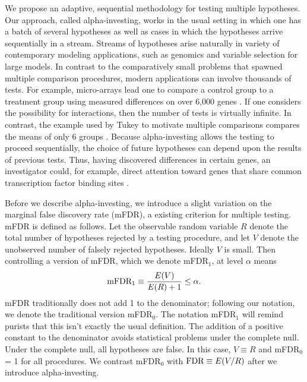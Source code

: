 \documentclass[12pt]{article}
\begin{document}
We propose an adaptive, sequential methodology for testing multiple
hypotheses. Our approach, called alpha-investing, works in the usual
setting in which one has a batch of several hypotheses as well as
cases in which the hypotheses arrive sequentially in a stream.
Streams of hypotheses arise naturally in variety of contemporary
modeling applications, such as genomics and variable selection for
large models.  In contrast to the comparatively small problems that
spawned multiple comparison procedures, modern applications can
involve thousands of tests.  For example, micro-arrays lead one to
compare a control group to a treatment group using measured
differences on over 6,000 genes \citep{shaffer03}.  If one considers
the possibility for interactions, then the number of tests is
virtually infinite. In contrast, the example used by Tukey to motivate
multiple comparisons compares the means of only 6 groups
\citep[][available in \citet{braun94}] {tukey53}.  Because
alpha-investing allows the testing to proceed sequentially, the choice
of future hypotheses can depend upon the results of previous tests.
Thus, having discovered differences in certain genes, an investigator
could, for example, direct attention toward genes that share common
transcription factor binding sites \citep{gupta05}.

Before we describe alpha-investing, we introduce a slight variation on
 the marginal false discovery rate (mFDR), a existing criterion for
 multiple testing.  mFDR is defined as follows. Let the observable
 random variable $R$ denote the total number of hypotheses rejected by
 a testing procedure, and let $V$ denote the unobserved number of
 falsely rejected hypotheses.  Ideally $V$ is small.  Then controlling
 a version of mFDR, which we denote mFDR${}_1$, at level $\alpha$ means
\begin{equation}
\label{eq:mFDR}
\hbox{mFDR}_1 \equiv \frac{E(V)}{E(R) + 1} \le \alpha.
\end{equation}
mFDR traditionally does not add 1 to the denominator; following our
notation, we denote the traditional version mFDR${}_0$. The notation
mFDR${}_1$ will remind purists that this isn't exactly the usual
definition.  The addition of a positive constant to the denominator
avoids statistical problems under the complete null.  Under the
complete null, all hypotheses are false.  In this case, $V \equiv R$
and mFDR${}_{0}$ = 1 for all procedures.  We contrast mFDR${}_0$ with
$\hbox{FDR} \equiv E(V/R)$ after we introduce alpha-investing.
\end{document}
